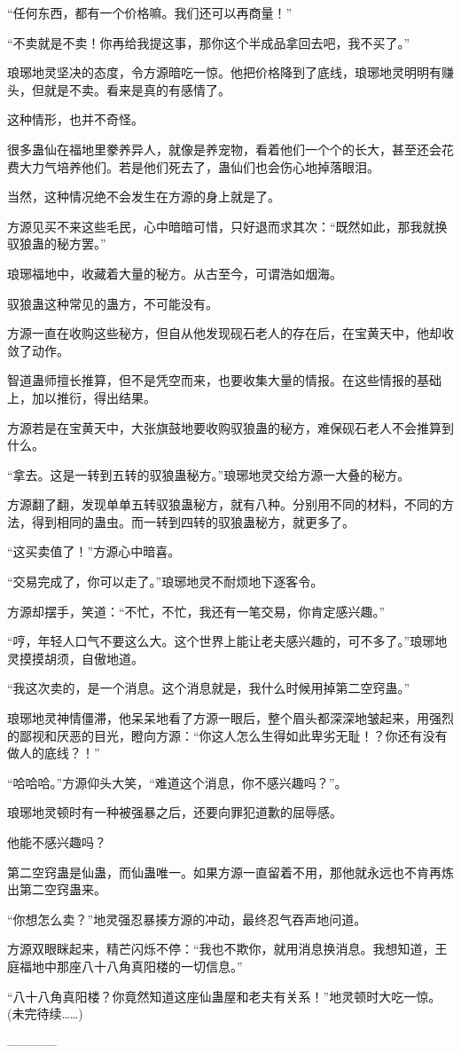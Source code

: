 \begin{this_body}
“任何东西，都有一个价格嘛。我们还可以再商量！”

“不卖就是不卖！你再给我提这事，那你这个半成品拿回去吧，我不买了。”

琅琊地灵坚决的态度，令方源暗吃一惊。他把价格降到了底线，琅琊地灵明明有赚头，但就是不卖。看来是真的有感情了。

这种情形，也并不奇怪。

很多蛊仙在福地里豢养异人，就像是养宠物，看着他们一个个的长大，甚至还会花费大力气培养他们。若是他们死去了，蛊仙们也会伤心地掉落眼泪。

当然，这种情况绝不会发生在方源的身上就是了。

方源见买不来这些毛民，心中暗暗可惜，只好退而求其次：“既然如此，那我就换驭狼蛊的秘方罢。”

琅琊福地中，收藏着大量的秘方。从古至今，可谓浩如烟海。

驭狼蛊这种常见的蛊方，不可能没有。

方源一直在收购这些秘方，但自从他发现砚石老人的存在后，在宝黄天中，他却收敛了动作。

智道蛊师擅长推算，但不是凭空而来，也要收集大量的情报。在这些情报的基础上，加以推衍，得出结果。

方源若是在宝黄天中，大张旗鼓地要收购驭狼蛊的秘方，难保砚石老人不会推算到什么。

“拿去。这是一转到五转的驭狼蛊秘方。”琅琊地灵交给方源一大叠的秘方。

方源翻了翻，发现单单五转驭狼蛊秘方，就有八种。分别用不同的材料，不同的方法，得到相同的蛊虫。而一转到四转的驭狼蛊秘方，就更多了。

“这买卖值了！”方源心中暗喜。

“交易完成了，你可以走了。”琅琊地灵不耐烦地下逐客令。

方源却摆手，笑道：“不忙，不忙，我还有一笔交易，你肯定感兴趣。”

“哼，年轻人口气不要这么大。这个世界上能让老夫感兴趣的，可不多了。”琅琊地灵摸摸胡须，自傲地道。

“我这次卖的，是一个消息。这个消息就是，我什么时候用掉第二空窍蛊。”

琅琊地灵神情僵滞，他呆呆地看了方源一眼后，整个眉头都深深地皱起来，用强烈的鄙视和厌恶的目光，瞪向方源：“你这人怎么生得如此卑劣无耻！？你还有没有做人的底线？！”

“哈哈哈。”方源仰头大笑，“难道这个消息，你不感兴趣吗？”。

琅琊地灵顿时有一种被强暴之后，还要向罪犯道歉的屈辱感。

他能不感兴趣吗？

第二空窍蛊是仙蛊，而仙蛊唯一。如果方源一直留着不用，那他就永远也不肯再炼出第二空窍蛊来。

“你想怎么卖？”地灵强忍暴揍方源的冲动，最终忍气吞声地问道。

方源双眼眯起来，精芒闪烁不停：“我也不欺你，就用消息换消息。我想知道，王庭福地中那座八十八角真阳楼的一切信息。”

“八十八角真阳楼？你竟然知道这座仙蛊屋和老夫有关系！”地灵顿时大吃一惊。(未完待续……)

------------

\end{this_body}

